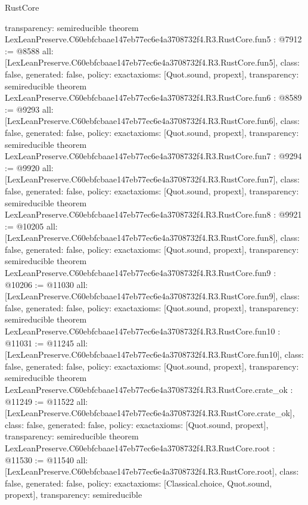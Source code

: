 \begin{lexlean}{RustCore}
\begin{coremodule}
{  transparency: semireducible
}
theorem LexLeanPreserve.C60ebfcbaae147eb77ec6e4a3708732f4.R3.RustCore.fun5 : @7912 := @8588 {
  all: [LexLeanPreserve.C60ebfcbaae147eb77ec6e4a3708732f4.R3.RustCore.fun5],
  class: false,
  generated: false,
  policy: exact{axioms: [Quot.sound, propext]},
  transparency: semireducible
}
theorem LexLeanPreserve.C60ebfcbaae147eb77ec6e4a3708732f4.R3.RustCore.fun6 : @8589 := @9293 {
  all: [LexLeanPreserve.C60ebfcbaae147eb77ec6e4a3708732f4.R3.RustCore.fun6],
  class: false,
  generated: false,
  policy: exact{axioms: [Quot.sound, propext]},
  transparency: semireducible
}
theorem LexLeanPreserve.C60ebfcbaae147eb77ec6e4a3708732f4.R3.RustCore.fun7 : @9294 := @9920 {
  all: [LexLeanPreserve.C60ebfcbaae147eb77ec6e4a3708732f4.R3.RustCore.fun7],
  class: false,
  generated: false,
  policy: exact{axioms: [Quot.sound, propext]},
  transparency: semireducible
}
theorem LexLeanPreserve.C60ebfcbaae147eb77ec6e4a3708732f4.R3.RustCore.fun8 : @9921 := @10205 {
  all: [LexLeanPreserve.C60ebfcbaae147eb77ec6e4a3708732f4.R3.RustCore.fun8],
  class: false,
  generated: false,
  policy: exact{axioms: [Quot.sound, propext]},
  transparency: semireducible
}
theorem LexLeanPreserve.C60ebfcbaae147eb77ec6e4a3708732f4.R3.RustCore.fun9 : @10206 := @11030 {
  all: [LexLeanPreserve.C60ebfcbaae147eb77ec6e4a3708732f4.R3.RustCore.fun9],
  class: false,
  generated: false,
  policy: exact{axioms: [Quot.sound, propext]},
  transparency: semireducible
}
theorem LexLeanPreserve.C60ebfcbaae147eb77ec6e4a3708732f4.R3.RustCore.fun10 : @11031 := @11245 {
  all: [LexLeanPreserve.C60ebfcbaae147eb77ec6e4a3708732f4.R3.RustCore.fun10],
  class: false,
  generated: false,
  policy: exact{axioms: [Quot.sound, propext]},
  transparency: semireducible
}
theorem LexLeanPreserve.C60ebfcbaae147eb77ec6e4a3708732f4.R3.RustCore.crate_ok : @11249 := @11522 {
  all: [LexLeanPreserve.C60ebfcbaae147eb77ec6e4a3708732f4.R3.RustCore.crate_ok],
  class: false,
  generated: false,
  policy: exact{axioms: [Quot.sound, propext]},
  transparency: semireducible
}
theorem LexLeanPreserve.C60ebfcbaae147eb77ec6e4a3708732f4.R3.RustCore.root : @11530 := @11540 {
  all: [LexLeanPreserve.C60ebfcbaae147eb77ec6e4a3708732f4.R3.RustCore.root],
  class: false,
  generated: false,
  policy: exact{axioms: [Classical.choice, Quot.sound, propext]},
  transparency: semireducible
}


\end{coremodule}
\end{lexlean}
